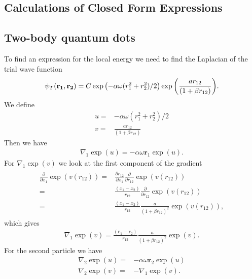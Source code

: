 \documentclass[../main.tex]{subfiles}
\begin{document}
\begin{appendices}

\chapter{Calculations of Closed Form Expressions}
\section{Two-body quantum dots}\label{sec:ClosedFormTwo}
To find an expression for the local energy we need to find the Laplacian of the trial wave function
\begin{equation}\label{eq:trial}
   \psi_{T}({\bf r_1},{\bf r_2}) = 
   C\exp{\left(-\alpha\omega(r_1^2+r_2^2)/2\right)}
   \exp{\left(\frac{ar_{12}}{(1+\beta r_{12})}\right)}.
\end{equation}
We define 
\begin{align}
    u =& -\alpha\omega(r_1^2+r_2^2)/2\\
    v =& \frac{ar_{12}}{(1+\beta r_{12})}
\end{align}
Then we have 
\begin{align}
    \nabla_1 \exp(u) = -\alpha\omega \mathbf{r}_1\exp(u).
\end{align}
For $\nabla_1 \exp(v)$ we look at the first component of the gradient
\begin{align}\label{eq: chainDeriv}
\begin{split}
    \frac{\partial}{\partial x_1} \exp(v(r_{12})) =& \frac{\partial r_{12}}{\partial x_1}\frac{\partial}{\partial r_{12}} \exp(v(r_{12}))\\
    =& \frac{(x_1 - x_2)}{r_{12}} \frac{\partial}{\partial r_{12}} \exp(v(r_{12}))\\
    =& \frac{(x_1 - x_2)}{r_{12}} \frac{a}{(1+\beta r_{12})^2}\exp(v(r_{12})),
\end{split}
\end{align}
which gives 
\begin{align}
    \nabla_1 \exp(v) = \frac{(\mathbf{r}_1 - \mathbf{r}_2)}{r_{12}} \frac{a}{(1+\beta r_{12})^2}\exp(v).
\end{align}
For the second particle we have 
\begin{align}
    \nabla_2 \exp(u) =& -\alpha\omega \mathbf{r}_2\exp(u)\\
    \nabla_2 \exp(v) =& -\nabla_1 \exp(v).

\end{align}
\end{appendices}
\end{document}
